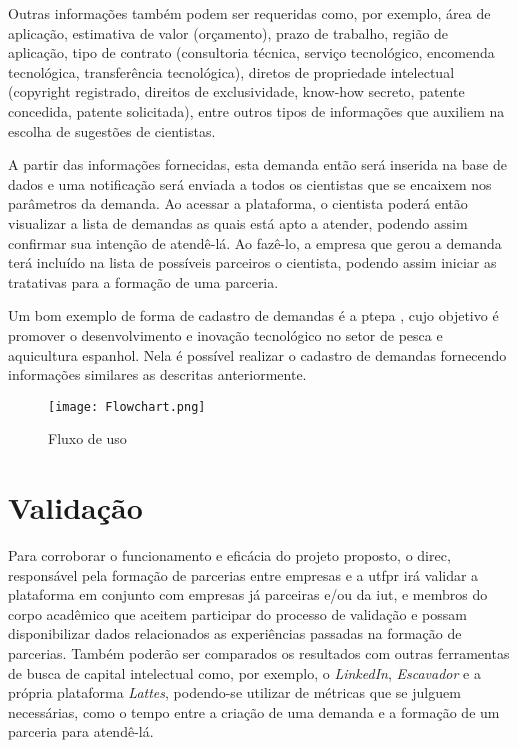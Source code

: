 Outras informações também podem ser requeridas como, por exemplo, área de aplicação, estimativa de valor (orçamento), prazo de trabalho, região de aplicação, tipo de contrato (consultoria técnica, serviço tecnológico, encomenda tecnológica, transferência tecnológica), diretos de propriedade intelectual (copyright registrado, direitos de exclusividade, know-how secreto, patente concedida, patente solicitada), entre outros tipos de informações que auxiliem na escolha de sugestões de cientistas.

A partir das informações fornecidas, esta demanda então será inserida na base de dados e uma notificação será enviada a todos os cientistas que se encaixem nos parâmetros da demanda. Ao acessar a plataforma, o cientista poderá então visualizar a lista de demandas as quais está apto a atender, podendo assim confirmar sua intenção de atendê-lá. Ao fazê-lo, a empresa que gerou a demanda terá incluído na lista de possíveis parceiros o cientista, podendo assim iniciar as tratativas para a formação de uma parceria.

Um bom exemplo de forma de cadastro de demandas é a \gls{ptepa} \cite{PlataformaPTEPA}, cujo objetivo é promover o desenvolvimento e inovação tecnológico no setor de pesca e aquicultura espanhol. Nela é possível realizar o cadastro de demandas fornecendo informações similares as descritas anteriormente.

\begin{figure}[htb]
    \caption{Fluxo de uso}
    \texttt{[image: Flowchart.png]}
    \label{fig:fluxograma}
\end{figure}

\section{Validação}\label{sec:validacao}

Para corroborar o funcionamento e eficácia do projeto proposto, o \gls{direc}, responsável pela formação de parcerias entre empresas e a \gls{utfpr} irá validar a plataforma em conjunto com empresas já parceiras e/ou da \gls{iut}, e membros do corpo acadêmico que aceitem participar do processo de validação e possam disponibilizar dados relacionados as experiências passadas na formação de parcerias. Também poderão ser comparados os resultados com outras ferramentas de busca de capital intelectual como, por exemplo, o \textit{LinkedIn}, \textit{Escavador} e a própria plataforma \textit{Lattes}, podendo-se utilizar de métricas que se julguem necessárias, como o tempo entre a criação de uma demanda e a formação de um parceria para atendê-lá.